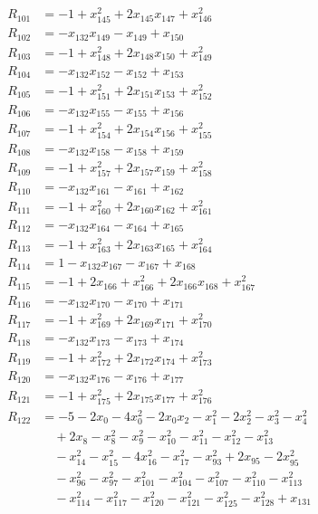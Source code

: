 \begin{align*}
R_{101}&=-1+x_{145}^{2}+2x_{145}x_{147}+x_{146}^{2}\\[2pt]
R_{102}&=-x_{132}x_{149}-x_{149}+x_{150}\\[2pt]
R_{103}&=-1+x_{148}^{2}+2x_{148}x_{150}+x_{149}^{2}\\[2pt]
R_{104}&=-x_{132}x_{152}-x_{152}+x_{153}\\[2pt]
R_{105}&=-1+x_{151}^{2}+2x_{151}x_{153}+x_{152}^{2}\\[2pt]
R_{106}&=-x_{132}x_{155}-x_{155}+x_{156}\\[2pt]
R_{107}&=-1+x_{154}^{2}+2x_{154}x_{156}+x_{155}^{2}\\[2pt]
R_{108}&=-x_{132}x_{158}-x_{158}+x_{159}\\[2pt]
R_{109}&=-1+x_{157}^{2}+2x_{157}x_{159}+x_{158}^{2}\\[2pt]
R_{110}&=-x_{132}x_{161}-x_{161}+x_{162}\\[2pt]
R_{111}&=-1+x_{160}^{2}+2x_{160}x_{162}+x_{161}^{2}\\[2pt]
R_{112}&=-x_{132}x_{164}-x_{164}+x_{165}\\[2pt]
R_{113}&=-1+x_{163}^{2}+2x_{163}x_{165}+x_{164}^{2}\\[2pt]
R_{114}&=1-x_{132}x_{167}-x_{167}+x_{168}\\[2pt]
R_{115}&=-1+2x_{166}+x_{166}^{2}+2x_{166}x_{168}+x_{167}^{2}\\[2pt]
R_{116}&=-x_{132}x_{170}-x_{170}+x_{171}\\[2pt]
R_{117}&=-1+x_{169}^{2}+2x_{169}x_{171}+x_{170}^{2}\\[2pt]
R_{118}&=-x_{132}x_{173}-x_{173}+x_{174}\\[2pt]
R_{119}&=-1+x_{172}^{2}+2x_{172}x_{174}+x_{173}^{2}\\[2pt]
R_{120}&=-x_{132}x_{176}-x_{176}+x_{177}\\[2pt]
R_{121}&=-1+x_{175}^{2}+2x_{175}x_{177}+x_{176}^{2}\\[2pt]
R_{122}&=-5-2x_{0}-4x_{0}^{2}-2x_{0}x_{2}-x_{1}^{2}-2x_{2}^{2}-x_{3}^{2}-x_{4}^{2}\\
&\quad +2x_{8}-x_{8}^{2}-x_{9}^{2}-x_{10}^{2}-x_{11}^{2}-x_{12}^{2}-x_{13}^{2}\\
&\quad -x_{14}^{2}-x_{15}^{2}-4x_{16}^{2}-x_{17}^{2}-x_{93}^{2}+2x_{95}-2x_{95}^{2}\\
&\quad -x_{96}^{2}-x_{97}^{2}-x_{101}^{2}-x_{104}^{2}-x_{107}^{2}-x_{110}^{2}-x_{113}^{2}\\
&\quad -x_{114}^{2}-x_{117}^{2}-x_{120}^{2}-x_{121}^{2}-x_{125}^{2}-x_{128}^{2}+x_{131}\\

\end{align*}
